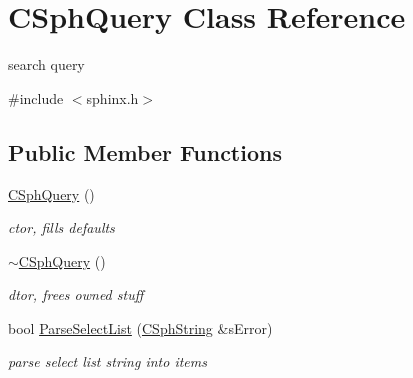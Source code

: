 \hypertarget{classCSphQuery}{\section{C\-Sph\-Query Class Reference}
\label{classCSphQuery}
}


search query  




{\ttfamily \#include $<$sphinx.\-h$>$}

\subsection*{Public Member Functions}
\begin{DoxyCompactItemize}
\item 
\hyperlink{classCSphQuery_a9570ab122eb9be85b5e87316b9cdf895}{C\-Sph\-Query} ()
\begin{DoxyCompactList}\small\item\em ctor, fills defaults \end{DoxyCompactList}\item 
\hyperlink{classCSphQuery_a751bfefecaf69db8916e58bdcbd42521}{$\sim$\-C\-Sph\-Query} ()
\begin{DoxyCompactList}\small\item\em dtor, frees owned stuff \end{DoxyCompactList}\item 
bool \hyperlink{classCSphQuery_a1ca4b4c4bdbd1de5abdaa8d69602eefd}{Parse\-Select\-List} (\hyperlink{structCSphString}{C\-Sph\-String} \&s\-Error)
\begin{DoxyCompactList}\small\item\em parse select list string into items \end{DoxyCompactList}\end{DoxyCompactItemize}
